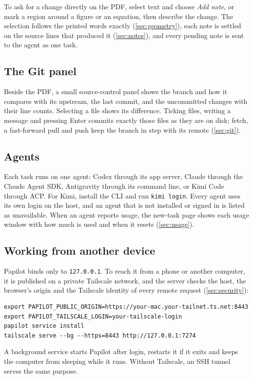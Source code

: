 To ask for a change directly on the PDF, select text and choose \emph{Add note},
or mark a region around a figure or an equation, then describe the change. The
selection follows the printed words exactly (\cref{sec:geometry}), each note is
settled on the source lines that produced it (\cref{sec:notes}), and every
pending note is sent to the agent as one task.

\subsection{The Git panel}

Beside the PDF, a small source-control panel shows the branch and how it
compares with its upstream, the last commit, and the uncommitted changes with
their line counts. Selecting a file shows its difference. Ticking files,
writing a message and pressing Enter commits exactly those files as they are on
disk; fetch, a fast-forward pull and push keep the branch in step with its
remote (\cref{sec:git}).

\subsection{Agents}

Each task runs on one agent: Codex through its app server, Claude through the
Claude Agent SDK, Antigravity through its command line, or Kimi Code through
ACP. For Kimi, install the CLI and run \texttt{kimi login}. Every agent uses its
own login on the host, and an agent that is not installed or signed in is listed
as unavailable. When an agent reports usage, the new-task page shows each usage
window with how much is used and when it resets (\cref{sec:usage}).

\subsection{Working from another device}

Papilot binds only to \texttt{127.0.0.1}. To reach it from a phone or another
computer, it is published on a private Tailscale network, and the server checks
the host, the browser's origin and the Tailscale identity of every remote
request (\cref{sec:security}):
\begin{verbatim}
export PAPILOT_PUBLIC_ORIGIN=https://your-mac.your-tailnet.ts.net:8443
export PAPILOT_TAILSCALE_LOGIN=your-tailscale-login
papilot service install
tailscale serve --bg --https=8443 http://127.0.0.1:7274
\end{verbatim}
A background service starts Papilot after login, restarts it if it exits and
keeps the computer from sleeping while it runs. Without Tailscale, an SSH
tunnel serves the same purpose.

